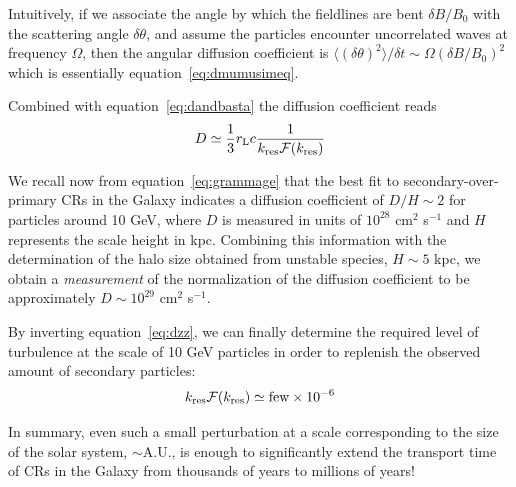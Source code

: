Intuitively, if we associate the angle by which the fieldlines are bent $\delta B/B_0$ with the scattering angle $\delta \theta$, and assume the particles encounter uncorrelated waves at frequency $\Omega$, then the angular diffusion coefficient is $\langle (\delta \theta)^2 \rangle / \delta t \sim \Omega (\delta B/B_0)^2$ which is essentially equation~\eqref{eq:dmumusimeq}. 

Combined with equation~\eqref{eq:dandbasta} the diffusion coefficient reads
%
\begin{equation}
D \simeq \frac{1}{3} r_{\rm L} c \frac{1}{k_{\rm res} \mathcal F(k_{\rm res})}
\label{eq:dzz}
\end{equation} 

We recall now from equation~\eqref{eq:grammage} that the best fit to secondary-over-primary CRs in the Galaxy indicates a diffusion coefficient of $D/H \sim 2$ for particles around 10 GeV, where $D$ is measured in units of $10^{28}$ cm$^2$ s$^{-1}$ and $H$ represents the scale height in kpc. 
%
Combining this information with the determination of the halo size obtained from unstable species, $H \sim 5$ kpc, we obtain a \emph{measurement} of the normalization of the diffusion coefficient to be approximately $D \sim 10^{29}$ cm$^2$ s$^{-1}$.


By inverting equation~\eqref{eq:dzz}, we can finally determine the required level of turbulence at the scale of 10 GeV particles in order to replenish the observed amount of secondary particles:
%
\begin{equation}
k_{\rm res} \mathcal F(k_{\rm res}) \simeq \text{few} \times 10^{-6}
\end{equation}

In summary, even such a small perturbation at a scale corresponding to the size of the solar system, $\sim$A.U., is enough to significantly extend the transport time of CRs in the Galaxy from thousands of years to millions of years!

